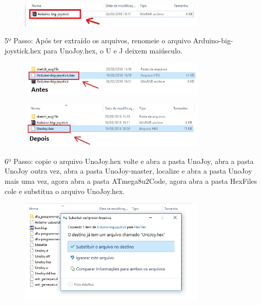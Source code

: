 \documentclass[
	12pt,			%
	openright,		%
	oneside,			%
	a4paper,			%
	chapter=TITLE,		%
	english,			%
	brazil,			%
	]{abntex2}
\begin{document}
\begin{anexosenv}
\begin{figure}[H]
	\centering
		\includegraphics[width=0.8\textwidth]{./img/anex-img-3.jpg}
\end{figure}

5º Passo: Após ter extraído os arquivos, renomeie o arquivo Arduino-big-joystick.hex para UnoJoy.hex, o U e J deixem maiúsculo.

\begin{figure}[H]
	\centering
		\includegraphics[width=0.8\textwidth]{./img/anex-img-4.jpg}
\end{figure}

\begin{figure}[H]
	\centering
		\includegraphics[width=0.8\textwidth]{./img/anex-img-5.jpg}
\end{figure}

6º Passo: copie o arquivo UnoJoy.hex volte e abra a pasta UnoJoy, abra a pasta UnoJoy outra vez, abra a pasta UnoJoy-master, localize e abra a pasta UnoJoy mais uma vez, agora abra a pasta ATmega8u2Code, agora abra a pasta HexFiles cole e substitua o arquivo UnoJoy.hex.

\begin{figure}[H]
	\centering
		\includegraphics[width=0.8\textwidth]{./img/anex-img-6.jpg}
\end{figure}


\end{anexosenv}
\end{document}
